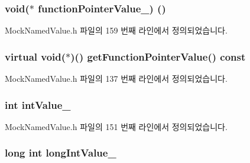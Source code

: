 \subsubsection[{\texorpdfstring{function\+Pointer\+Value\+\_\+}{functionPointerValue_}}]{\setlength{\rightskip}{0pt plus 5cm}void($\ast$ function\+Pointer\+Value\+\_\+) ()}\hypertarget{class_mock_named_value_aef42fb6617558520f912651fbfe07c53}{}\label{class_mock_named_value_aef42fb6617558520f912651fbfe07c53}


Mock\+Named\+Value.\+h 파일의 159 번째 라인에서 정의되었습니다.

\subsubsection[{\texorpdfstring{get\+Function\+Pointer\+Value}{getFunctionPointerValue}}]{\setlength{\rightskip}{0pt plus 5cm}virtual void($\ast$)() get\+Function\+Pointer\+Value() const}\hypertarget{class_mock_named_value_abd0a9fd7e8b1d7880c4f8b01ded85657}{}\label{class_mock_named_value_abd0a9fd7e8b1d7880c4f8b01ded85657}


Mock\+Named\+Value.\+h 파일의 137 번째 라인에서 정의되었습니다.

\subsubsection[{\texorpdfstring{int\+Value\+\_\+}{intValue_}}]{\setlength{\rightskip}{0pt plus 5cm}int int\+Value\+\_\+}\hypertarget{class_mock_named_value_a1da7506365ae1c2052808377b4a26791}{}\label{class_mock_named_value_a1da7506365ae1c2052808377b4a26791}


Mock\+Named\+Value.\+h 파일의 151 번째 라인에서 정의되었습니다.

\subsubsection[{\texorpdfstring{long\+Int\+Value\+\_\+}{longIntValue_}}]{\setlength{\rightskip}{0pt plus 5cm}long int long\+Int\+Value\+\_\+}\hypertarget{class_mock_named_value_afce071bcbe8335723084f41802df821b}{}\label{class_mock_named_value_afce071bcbe8335723084f41802df821b}


